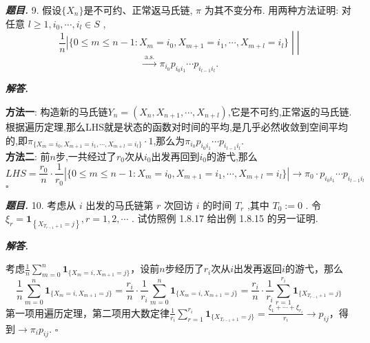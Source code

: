 \documentclass[10pt, a4paper, oneside]{ctexart}
\newenvironment{problem}{\begin{framed}\par\noindent\textbf{\textit{题目. }}}{\end{framed}\par}
\newenvironment{solution}{%
  \par\noindent\textbf{\textit{解答. }}\ignorespaces
}{%
  \hfill\ensuremath{\square}\par %
}
\begin{document}
\begin{problem}
    9. 假设$\{X_n\}$是不可约、正常返马氏链, \( \pi  \) 为其不变分布. 用两种方法证明: 对任意 \( l \geq  1,{i}_{0},\cdots ,{i}_{l} \in  S \) ,
\[\left. {\left. {\frac{1}{n}\left| {\{ 0 \leq  m \leq  n - 1 : {X}_{m} = {i}_{0},{X}_{m + 1} = {i}_{1},\cdots ,{X}_{m + l} = {i}_{l}\} }\right. \;}\right| \;}\right| \]
\[\xrightarrow[]{\text{ a.s. }}{\pi }_{{i}_{0}}{p}_{{i}_{0}{i}_{1}}\cdots {p}_{{i}_{l - 1}{i}_{l}}.\]
\end{problem}
\begin{solution}
    \textbf{方法一}: 构造新的马氏链$Y_n=(X_{n},X_{n+1},\cdots,X_{n+l})$,它是不可约,正常返的马氏链.根据遍历定理,那么LHS就是状态的函数对时间的平均,是几乎必然收敛到空间平均的,即$\pi_{\{{X}_{m} = {i}_{0},{X}_{m + 1} = {i}_{1},\cdots ,{X}_{m + l} = {i}_{l}\}}\cdot 1$,那么为${\pi }_{{i}_{0}}{p}_{{i}_{0}{i}_{1}}\cdots {p}_{{i}_{l - 1}{i}_{l}}$.\\
    \textbf{方法二}: 前$n$步,一共经过了$r_0$次从$i_0$出发再回到$i_0$的游弋,那么 
    $$LHS=\frac{r_0}{n}\cdot \frac{1}{r_0}\left| {\{ 0 \leq  m \leq  n - 1 : {X}_{m} = {i}_{0},{X}_{m + 1} = {i}_{1},\cdots ,{X}_{m + l} = {i}_{l}\} }\right|\to \pi_0 \cdot {p}_{{i}_{0}{i}_{1}}\cdots {p}_{{i}_{l - 1}{i}_{l}}$$
\end{solution}

\begin{problem}
    10. 考虑从 \( i \) 出发的马氏链第 \( r \) 次回访 \( i \) 的时间 \( {T}_{r} \) ,其中 \( {T}_{0} \mathrel{\text{:=}} 0 \) . 令 \( {\xi }_{r} = {\mathbf{1}}_{\left\{  {X}_{{T}_{r - 1} + 1} = j\right\}  },r = 1,2,\cdots  \) . 试仿照例 1.8.17 给出例 1.8.15 的另一证明.
\end{problem}
\begin{solution}
    考虑$\frac{1}{n}\sum_{m=0}^{n}\mathbf{1}_{\{X_{m}=i,X_{m+1}=j\}}$，设前$n$步经历了$r_i$次从$i$出发再返回$i$的游弋，那么
    $$\frac{1}{n}\sum_{m=0}^{n}\mathbf{1}_{\{X_{m}=i,X_{m+1}=j\}}=\frac{r_i}{n}\cdot \frac{1}{r_i}\sum_{m=0}^{n}\mathbf{1}_{\{X_{m}=i,X_{m+1}=j\}}=\frac{r_i}{n}\cdot \frac{1}{r_i}\sum_{r=1}^{r_i}\mathbf{1}_{\{X_{T_{r-1}+1}=j\}}$$
    第一项用遍历定理，第二项用大数定律$\frac{1}{r_i}\sum_{r=1}^{r_i}\mathbf{1}_{\{X_{T_{r-1}+1}=j\}}=\frac{\xi_1+\cdots+\xi_{r_i}}{r_i}\to p_{ij}$，得到$\to \pi_ip_{ij}$.
\end{solution}
\end{document}
